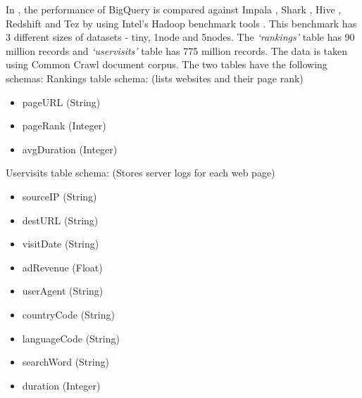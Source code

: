 \documentclass[9pt,twocolumn,twoside]{../../styles/osajnl}
\begin{document}
\noindent
In \cite{www-benchmarks-bigguery}, the performance
\cite{www-benchmarks-amplab} of BigQuery is compared against Impala
\cite{www-impala}, Shark \cite{www-apache-spark}, Hive
\cite{www-apache-hive}, Redshift \cite{www-amazon-redshift} and Tez
\cite{www-apache-tez} by using Intel's Hadoop benchmark
\cite{www-benchmarks-intel} tools . This benchmark has 3 different
sizes of datasets - tiny, 1node and 5nodes. The \textit{‘rankings’}
table has 90 million records and \textit{‘uservisits’} table has 775 million
records. The data is taken using Common Crawl \cite{www-commoncrawl}
document corpus. The two tables have the following
schemas:\newline \newline
\noindent
Rankings table schema: (lists websites and their page rank)
\begin{itemize}[noitemsep,topsep=0pt] \item pageURL (String) \item pageRank (Integer) \item avgDuration (Integer) \newline
\end{itemize}
\noindent
Uservisits table schema: (Stores server logs for each web page)
\begin{itemize}[noitemsep,topsep=0pt] \item sourceIP (String) \item destURL (String) \item visitDate (String) \item adRevenue (Float) \item userAgent (String) \item countryCode (String) \item languageCode (String) \item searchWord (String) \item duration (Integer) \newline
\end{itemize}
\end{document}
